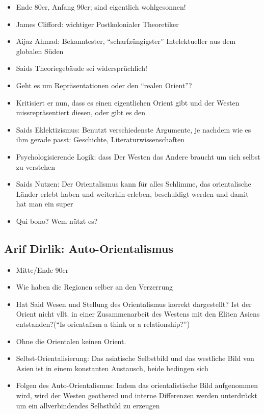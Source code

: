 \documentclass[emulatestandardclasses]{scrartcl}
\begin{document}
\begin{itemize}
  \item Ende 80er, Anfang 90er; sind eigentlich wohlgesonnen!
  \item James Clifford: wichtiger Postkolonialer Theoretiker
  \item Aijaz Ahmad: Bekanntester, "`scharfzüngigster"' Intelektueller aus dem globalen Süden
  \item Saids Theoriegebäude sei widersprüchlich!
  \item Geht es um Repräsentationen oder den "`realen Orient"'? 
  \item Kritisiert er nun, dass es einen eigentlichen Orient gibt und der Westen missrepräsentiert diesen, oder gibt es den 
  \item Saids Eklektizismus: Benutzt verschiedenste Argumente, je nachdem wie es ihm gerade passt: Geschichte, Literaturwissenschaften
  \item Psychologisierende Logik: dass Der Westen das Andere braucht um sich selbst zu verstehen
  \item Saids Nutzen: Der Orientalismus kann für alles Schlimme, das orientalische Länder erlebt haben und weiterhin erleben, beschuldigt werden und damit hat man ein super 
  \item Qui bono? Wem nützt es? 
\end{itemize}


\subsection{Arif Dirlik: Auto-Orientalismus}

\begin{itemize}
  \item Mitte/Ende 90er
  \item Wie haben die Regionen selber an den Verzerrung 
  \item Hat Said Wesen und Stellung des Orientalismus korrekt dargestellt? Ist der Orient nicht vllt. in einer Zusammenarbeit des Westens mit den Eliten Asiens entstanden?("`Is orientalism a think or a relationship?"')
  \item Ohne die Orientalen keinen Orient.
  \item Selbst-Orientalisierung: Das asiatische Selbstbild und das westliche Bild von Asien ist in einem konstanten Austausch, beide bedingen sich
  \item Folgen des Auto-Orientalismus: Indem das orientalistische Bild aufgenommen wird, wird der Westen geothered und interne Differenzen werden unterdrückt um ein allverbindendes Selbstbild zu erzeugen
\end{itemize}
\end{document}
